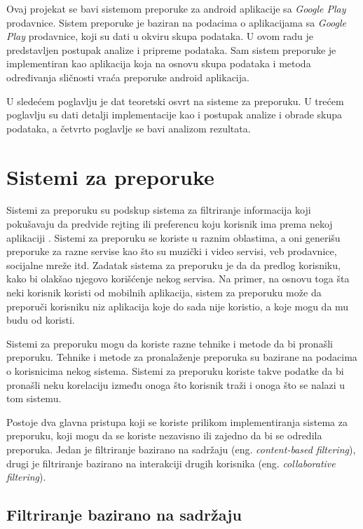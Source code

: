 \documentclass[a4paper,12pt,titlepage]{article}
\begin{document}
Ovaj projekat se bavi sistemom preporuke za android aplikacije sa \emph{Google Play} prodavnice. Sistem preporuke je baziran na podacima o aplikacijama sa \emph{Google Play} prodavnice, koji su dati u okviru skupa podataka. U ovom radu je predstavljen postupak analize i pripreme podataka. Sam sistem preporuke je implementiran kao aplikacija koja na osnovu skupa podataka i metoda određivanja sličnosti vraća preporuke android aplikacija.

U sledećem poglavlju je dat teoretski osvrt na sisteme za preporuku. U trećem poglavlju su dati detalji implementacije kao i postupak analize i obrade skupa podataka, a četvrto poglavlje se bavi analizom rezultata.



\section{Sistemi za preporuke}%

Sistemi za preporuku su podskup sistema za filtriranje informacija koji pokušavaju da predvide rejting ili preferencu koju korisnik ima prema nekoj aplikaciji \cite{RecommendSystem}. Sistemi za preporuku se koriste u raznim oblastima, a oni generišu preporuke za razne servise kao što su muzički i video servisi, veb prodavnice, socijalne mreže itd. Zadatak sistema za preporuku je da da predlog korisniku, kako bi olakšao njegovo korišćenje nekog servisa. Na primer, na osnovu toga šta neki korisnik koristi od mobilnih aplikacija, sistem za preporuku može da preporuči korisniku niz aplikacija koje do sada nije koristio, a koje mogu da mu budu od koristi. 

Sistemi za preporuku mogu da koriste razne tehnike i metode da bi pronašli preporuku. Tehnike i metode za pronalaženje preporuka su bazirane na podacima o korisnicima nekog sistema. Sistemi za preporuku koriste takve podatke da bi pronašli neku korelaciju između onoga što korisnik traži i onoga što se nalazi u tom sistemu.

Postoje dva glavna pristupa koji se koriste prilikom implementiranja sistema za preporuku, koji mogu da se koriste nezavisno ili zajedno da bi se odredila preporuka. Jedan je filtriranje bazirano na sadržaju  (eng. \emph{content-based filtering}), drugi je filtriranje bazirano na interakciji drugih korisnika (eng. \emph{collaborative filtering}). 


\subsection{Filtriranje bazirano na sadržaju}
\end{document}
